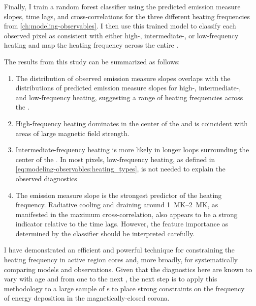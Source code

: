 Finally, I train a random forest classifier using the predicted emission measure slopes, time lags, and cross-correlations for the three different heating frequencies from \autoref{ch:modeling-observables}. I then use this trained model to classify each observed pixel as consistent with either high-, intermediate-, or low-frequency heating and map the heating frequency across the entire \AR{}.

The results from this study can be summarized as follows:
\begin{enumerate}
    \item The distribution of observed emission measure slopes overlaps with the distributions of predicted emission measure slopes for high-, intermediate-, and low-frequency heating, suggesting a range of heating frequencies across the \AR{}.
    \item High-frequency heating dominates in the center of the \AR{} and is coincident with areas of large magnetic field strength.
    \item Intermediate-frequency heating is more likely in longer loops surrounding the center of the \AR{}. In most pixels, low-frequency heating, as defined in \autoref{eq:modeling-observables:heating_types}, is not needed to explain the observed diagnostics
    \item The emission measure slope is the strongest predictor of the heating frequency. Radiative cooling and draining around \SIrange{1}{2}{\mega\kelvin}, as manifested in the maximum cross-correlation, also appears to be a strong indicator relative to the time lags. However, the feature importance as determined by the classifier should be interpreted carefully.
\end{enumerate}

I have demonstrated an efficient and powerful technique for constraining the heating frequency in active region cores and, more broadly, for systematically comparing models and observations. Given that the diagnostics here are known to vary with age \citep[e.g.][]{schmelz_cold_2012,del_zanna_evolution_2015} and from one \AR{} to the next \citep{warren_systematic_2012,viall_survey_2017}, the next step is to apply this methodology to a large sample of \AR s to place strong constraints on the frequency of energy deposition in the magnetically-closed corona.
